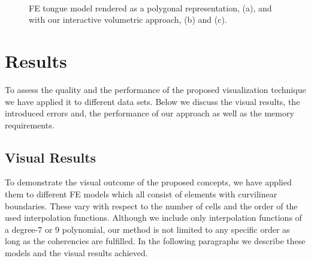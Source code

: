 \documentclass[journal]{vgtc}                %
\begin{document}
\begin{figure}
    \centering 
    \\
    \caption{FE tongue model rendered as a polygonal representation, (a), and with our interactive volumetric approach, (b) and (c).}
    \label{fig:tongue}
\end{figure}
%
%
%
\section{Results}\label{sec:results}
To assess the quality and the performance of the proposed visualization technique we have applied it to different data sets. Below we discuss the visual results, the introduced errors and, the performance of our approach as well as the memory requirements.
%
%
%
\subsection{Visual Results}
To demonstrate the visual outcome of the proposed concepts, we have applied them to different FE models which all consist of elements with curvilinear boundaries. These vary with respect to the number of cells and the order of the used interpolation functions. Although we include only interpolation functions of a degree-7 or 9 polynomial, our method is not limited to any specific order as long as the coherencies are fulfilled. In the following paragraphs we describe these models and the visual results achieved.
\end{document}

